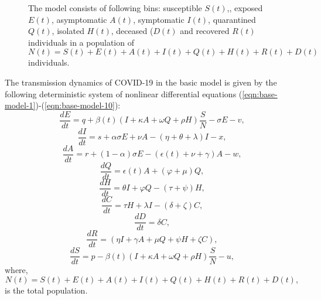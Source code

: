 \documentclass[authoryear,preprint]{elsarticle}
\begin{document}
\begin{figure*}
\begin{tikzpicture}[x=0.75pt,y=0.75pt,yscale=-0.75,xscale=0.75]
\end{tikzpicture}

\caption[Model]{The model consists of following bins: susceptible $S(t)$,, exposed $E(t)$, asymptomatic $A(t)$, symptomatic $I(t)$, quarantined $Q(t)$, isolated $H(t)$,  deceased ($D(t)$ and recovered $R(t)$ individuals in a population of $N(t) = S(t) + E(t) + A(t) + I(t) + Q(t) + H(t) + R(t) + D(t)$ individuals.}
\label{fig1} 
\end{figure*}

The transmission dynamics of COVID-19 in the basic model is given by the following deterministic system of nonlinear differential equations (\ref{eqn:base-model-1})-(\ref{eqn:base-model-10}):
\begin{equation}
\frac{dE}{dt} = q + \beta(t) \left( I + \kappa A + \omega Q + \rho H \right) \frac{S}{N} - \sigma E - v, 
\label{eqn:base-model-1}
\end{equation}
\begin{equation}
\frac{dI}{dt} = s + \alpha \sigma E + \nu A - \left( \eta + \theta + \lambda \right) I - x,
\label{eqn:base-model-2}
\end{equation}
\begin{equation}
\frac{dA}{dt} = r + \left( 1-\alpha \right) \sigma E - \left( \epsilon(t) + \nu + \gamma \right) A - w,
\label{eqn:base-model-3}
\end{equation}
\begin{equation}
\frac{dQ}{dt} = \epsilon(t) A + \left( \varphi + \mu \right) Q,
\label{eqn:base-model-4}
\end{equation}
\begin{equation}
\frac{dH}{dt} = \theta I + \varphi Q - \left( \tau + \psi \right) H ,
\label{eqn:base-model-5}
\end{equation}
\begin{equation}
\frac{dC}{dt} =  \tau H + \lambda I - \left( \delta + \zeta \right) C,
\label{eqn:base-model-6}
\end{equation}
\begin{equation}
\frac{dD}{dt} =  \delta C,
\label{eqn:base-model-7}
\end{equation}
\begin{equation}
\frac{dR}{dt} =  \left( \eta I +  \gamma A + \mu Q + \psi H + \zeta C \right),
\label{eqn:base-model-8}
\end{equation}
\begin{equation}
\frac{dS}{dt} = p -\beta(t) \left( I + \kappa A + \omega Q + \rho H \right) \frac{S}{N} - u,
\label{eqn:base-model-9}
\end{equation}
where,
\begin{equation}
N(t) = S(t) + E(t) + A(t) + I(t) + Q(t) + H(t) + R(t) + D(t),
\label{eqn:base-model-10}
\end{equation}
is the total population. 
\end{document}
